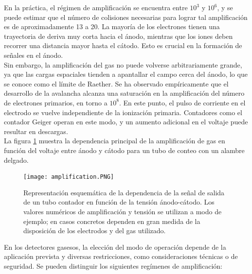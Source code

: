 \documentclass{article}
\begin{document}
\noindent En la práctica, el régimen de amplificación se encuentra entre \(10^3\) y \(10^6\), y se puede estimar que el número de colisiones necesarias para lograr tal amplificación es de aproximadamente 13 a 20. La mayoría de los electrones tienen una trayectoria de deriva muy corta hacia el ánodo, mientras que los iones deben recorrer una distancia mayor hasta el cátodo. Esto es crucial en la formación de señales en el ánodo.\\

\noindent Sin embargo, la amplificación del gas no puede volverse arbitrariamente grande, ya que las cargas espaciales tienden a apantallar el campo cerca del ánodo, lo que se conoce como el límite de Raether. Se ha observado empíricamente que el desarrollo de la avalancha alcanza una saturación en la amplificación del número de electrones primarios, en torno a \(10^8\). En este punto, el pulso de corriente en el electrodo se vuelve independiente de la ionización primaria. Contadores como el contador Geiger operan en este modo, y un aumento adicional en el voltaje puede resultar en descargas.\\

\noindent La figura \ref{fig:amplification} muestra la dependencia principal de la amplificación de gas en función del voltaje entre ánodo y cátodo para un tubo de conteo con un alambre delgado. 


\begin{figure}[H]
    \centering
    \texttt{[image: amplification.PNG]}
    \caption{Representación esquemática de la dependencia de la
    señal de salida de un tubo contador en función de la tensión ánodo-cátodo. Los valores numéricos de amplificación y tensión se utilizan a modo de ejemplo; en casos concretos dependen en gran medida de la disposición de los electrodos y del gas utilizado. }
    \label{fig:amplification}
\end{figure}

\noindent En los detectores gasesos, la elección del modo de operación depende de la aplicación prevista y diversas restricciones, como consideraciones técnicas o de seguridad. Se pueden distinguir los siguientes regímenes de amplificación: 
\end{document}
